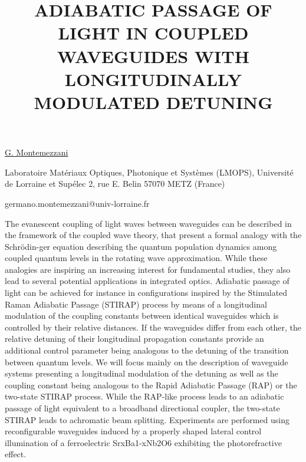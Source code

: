 \title{ADIABATIC PASSAGE OF LIGHT IN COUPLED WAVEGUIDES WITH LONGITUDINALLY MODULATED DETUNING}

\underline{G. Montemezzani} 

{\normalsize{\vspace{-4mm}
Laboratoire Mat\'eriaux Optiques, Photonique et Syst\`emes (LMOPS),
Universit\'e de Lorraine et Sup\'elec 2, rue E. Belin
57070 METZ (France)

\email germano.montemezzani@univ-lorraine.fr}}

The evanescent coupling of light waves between waveguides can be described in the framework of the coupled wave theory, that present a formal analogy with the Schr\"{o}din-ger equation describing the quantum population dynamics among coupled quantum levels in the rotating wave approximation. While these analogies are inspiring an increasing interest for fundamental studies, they also lead to several potential applications in integrated optics. Adiabatic passage of light can be achieved for instance in configurations inspired by the Stimulated Raman Adiabatic Passage (STIRAP) process by means of a longitudinal modulation of the coupling constants between identical waveguides which is controlled by their relative distances. If the waveguides differ from each other, the relative detuning of their longitudinal propagation constants provide an additional control parameter being analogous to the detuning of the transition between quantum levels. We will focus mainly on the description of waveguide systems presenting a longitudinal modulation of the detuning as well as the coupling constant being analogous to the Rapid Adiabatic Passage (RAP) or the two-state STIRAP process. While the RAP-like process leads to an adiabatic passage of light equivalent to a broadband directional coupler, the two-state STIRAP leads to achromatic beam splitting. Experiments are performed using reconfigurable waveguides induced by a properly shaped lateral control illumination of a ferroelectric SrxBa1-xNb2O6 exhibiting the photorefractive effect.


\vspace{\baselineskip} 